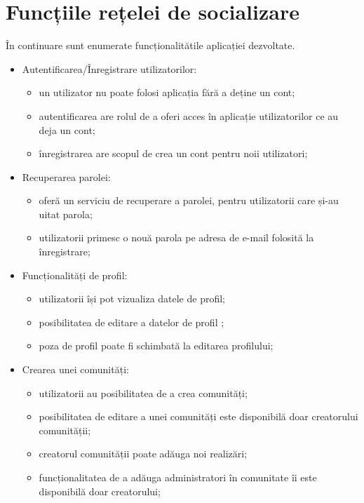 \section{Funcțiile rețelei de socializare}
În continuare sunt enumerate funcționalitătile aplicației dezvoltate.
\begin{itemize}
    \item{Autentificarea/Înregistrare utilizatorilor:}
        \begin{itemize}
            \item un utilizator nu poate folosi aplicația fără a deține un cont;
            \item autentificarea are rolul de a oferi acces în aplicație utilizatorilor ce au deja un cont;
            \item înregistrarea are scopul de crea un cont pentru noii utilizatori;
        \end{itemize}
    \item{Recuperarea parolei:}
        \begin{itemize}
            \item oferă un serviciu de recuperare a parolei, pentru utilizatorii care și-au uitat parola;
            \item utilizatorii primesc o nouă parola pe adresa de e-mail folosită la înregistrare; 
        \end{itemize}
    \item{Funcționalități de profil:}
        \begin{itemize}
            \item utilizatorii își pot vizualiza datele de profil;
            \item posibilitatea de editare a datelor de profil ;
            \item poza de profil poate fi schimbată la editarea profilului;
        \end{itemize}
    \item{Crearea unei comunități:}
        \begin{itemize}
            \item utilizatorii au posibilitatea de a crea comunități;
            \item posibilitatea de editare a unei comunități este disponibilă doar creatorului
            comunității;
            \item creatorul comunității poate adăuga noi realizări;
            \item funcționalitatea de a adăuga administratori în comunitate îi este disponibilă doar creatorului;

\end{itemize}
\end{itemize}
